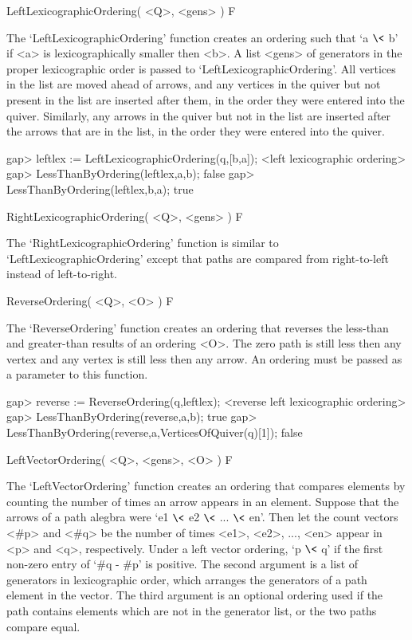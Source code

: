 \>LeftLexicographicOrdering( <Q>, <gens> ) F

The `LeftLexicographicOrdering' function creates an ordering such that
`a $\<$ b' if <a> is lexicographically smaller then <b>.  A list <gens> of
generators in the proper lexicographic order is passed to
`LeftLexicographicOrdering'.  All vertices in the list are moved ahead of
arrows, and any vertices in the quiver but not present in the list are
inserted after them, in the order they were entered into the quiver.
Similarly, any arrows in the quiver but not in the list are inserted after
the arrows that are in the list, in the order they were entered into the
quiver.

\beginexample
gap> leftlex := LeftLexicographicOrdering(q,[b,a]);
<left lexicographic ordering>
gap> LessThanByOrdering(leftlex,a,b);
false
gap> LessThanByOrdering(leftlex,b,a);
true
\endexample

\>RightLexicographicOrdering( <Q>, <gens> ) F

The `RightLexicographicOrdering' function is similar to
`LeftLexicographicOrdering' except that paths are compared from right-to-left
instead of left-to-right.

\>ReverseOrdering( <Q>, <O> ) F

The `ReverseOrdering' function creates an ordering that reverses the
less-than and greater-than results of an ordering <O>.  The zero path is
still less then any vertex and any vertex is still less then any arrow.  An
ordering must be passed as a parameter to this function.

\beginexample
gap> reverse := ReverseOrdering(q,leftlex);
<reverse left lexicographic ordering>
gap> LessThanByOrdering(reverse,a,b);
true
gap> LessThanByOrdering(reverse,a,VerticesOfQuiver(q)[1]);
false
\endexample

\>LeftVectorOrdering( <Q>, <gens>, <O> ) F

The `LeftVectorOrdering' function creates an ordering that compares elements
by counting the number of times an arrow appears in an element.  Suppose that
the arrows of a path alegbra were `e1 $\<$ e2 $\<$ ... $\<$ en'.  Then let
the count vectors <\#p> and <\#q> be the number of times <e1>, <e2>, ..., <en>
appear in <p> and <q>, respectively.  Under a left vector ordering,
`p $\<$ q' if the first non-zero entry of `\#q - \#p' is positive.  The
second argument is a list of generators in lexicographic order, which
arranges the generators of a path element in the vector.  The third argument
is an optional ordering used if the path contains elements which are not in
the generator list, or the two paths compare equal.

